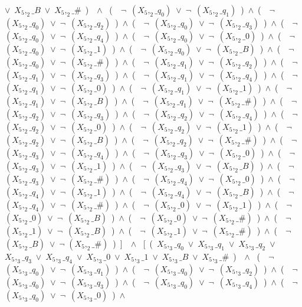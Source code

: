 ﻿\documentclass[a4paper,10pt]{article}
\begin{document}
$\vee$\ $X_5,_2\_B$\ $\vee$\ $X_5,_2\_\#$\ )\ \ $\wedge$ \ (\ \ $\neg$\ $(X_5,_2\_q_0)$\ $\vee$\ $\neg$\ $(X_5,_2\_q_1)$\ )\ $\wedge$\ (\ \ $\neg$\ $(X_5,_2\_q_0)$\ $\vee$\ $\neg$\ $(X_5,_2\_q_2)$\ )\ $\wedge$\ (\ \ $\neg$\ $(X_5,_2\_q_0)$\ $\vee$\ $\neg$\ $(X_5,_2\_q_3)$\ )\ $\wedge$\ (\ \ $\neg$\ $(X_5,_2\_q_0)$\ $\vee$\ $\neg$\ $(X_5,_2\_q_4)$\ )\ $\wedge$\ (\ \ $\neg$\ $(X_5,_2\_q_0)$\ $\vee$\ $\neg$\ $(X_5,_2\_0)$\ )\ $\wedge$\ (\ \ $\neg$\ $(X_5,_2\_q_0)$\ $\vee$\ $\neg$\ $(X_5,_2\_1)$\ )\ $\wedge$\ (\ \ $\neg$\ $(X_5,_2\_q_0)$\ $\vee$\ $\neg$\ $(X_5,_2\_B)$\ )\ $\wedge$\ (\ \ $\neg$\ $(X_5,_2\_q_0)$\ $\vee$\ $\neg$\ $(X_5,_2\_\#)$\ )\ $\wedge$\ (\ \ $\neg$\ $(X_5,_2\_q_1)$\ $\vee$\ $\neg$\ $(X_5,_2\_q_2)$\ )\ $\wedge$\ (\ \ $\neg$\ $(X_5,_2\_q_1)$\ $\vee$\ $\neg$\ $(X_5,_2\_q_3)$\ )\ $\wedge$\ (\ \ $\neg$\ $(X_5,_2\_q_1)$\ $\vee$\ $\neg$\ $(X_5,_2\_q_4)$\ )\ $\wedge$\ (\ \ $\neg$\ $(X_5,_2\_q_1)$\ $\vee$\ $\neg$\ $(X_5,_2\_0)$\ )\ $\wedge$\ (\ \ $\neg$\ $(X_5,_2\_q_1)$\ $\vee$\ $\neg$\ $(X_5,_2\_1)$\ )\ $\wedge$\ (\ \ $\neg$\ $(X_5,_2\_q_1)$\ $\vee$\ $\neg$\ $(X_5,_2\_B)$\ )\ $\wedge$\ (\ \ $\neg$\ $(X_5,_2\_q_1)$\ $\vee$\ $\neg$\ $(X_5,_2\_\#)$\ )\ $\wedge$\ (\ \ $\neg$\ $(X_5,_2\_q_2)$\ $\vee$\ $\neg$\ $(X_5,_2\_q_3)$\ )\ $\wedge$\ (\ \ $\neg$\ $(X_5,_2\_q_2)$\ $\vee$\ $\neg$\ $(X_5,_2\_q_4)$\ )\ $\wedge$\ (\ \ $\neg$\ $(X_5,_2\_q_2)$\ $\vee$\ $\neg$\ $(X_5,_2\_0)$\ )\ $\wedge$\ (\ \ $\neg$\ $(X_5,_2\_q_2)$\ $\vee$\ $\neg$\ $(X_5,_2\_1)$\ )\ $\wedge$\ (\ \ $\neg$\ $(X_5,_2\_q_2)$\ $\vee$\ $\neg$\ $(X_5,_2\_B)$\ )\ $\wedge$\ (\ \ $\neg$\ $(X_5,_2\_q_2)$\ $\vee$\ $\neg$\ $(X_5,_2\_\#)$\ )\ $\wedge$\ (\ \ $\neg$\ $(X_5,_2\_q_3)$\ $\vee$\ $\neg$\ $(X_5,_2\_q_4)$\ )\ $\wedge$\ (\ \ $\neg$\ $(X_5,_2\_q_3)$\ $\vee$\ $\neg$\ $(X_5,_2\_0)$\ )\ $\wedge$\ (\ \ $\neg$\ $(X_5,_2\_q_3)$\ $\vee$\ $\neg$\ $(X_5,_2\_1)$\ )\ $\wedge$\ (\ \ $\neg$\ $(X_5,_2\_q_3)$\ $\vee$\ $\neg$\ $(X_5,_2\_B)$\ )\ $\wedge$\ (\ \ $\neg$\ $(X_5,_2\_q_3)$\ $\vee$\ $\neg$\ $(X_5,_2\_\#)$\ )\ $\wedge$\ (\ \ $\neg$\ $(X_5,_2\_q_4)$\ $\vee$\ $\neg$\ $(X_5,_2\_0)$\ )\ $\wedge$\ (\ \ $\neg$\ $(X_5,_2\_q_4)$\ $\vee$\ $\neg$\ $(X_5,_2\_1)$\ )\ $\wedge$\ (\ \ $\neg$\ $(X_5,_2\_q_4)$\ $\vee$\ $\neg$\ $(X_5,_2\_B)$\ )\ $\wedge$\ (\ \ $\neg$\ $(X_5,_2\_q_4)$\ $\vee$\ $\neg$\ $(X_5,_2\_\#)$\ )\ $\wedge$\ (\ \ $\neg$\ $(X_5,_2\_0)$\ $\vee$\ $\neg$\ $(X_5,_2\_1)$\ )\ $\wedge$\ (\ \ $\neg$\ $(X_5,_2\_0)$\ $\vee$\ $\neg$\ $(X_5,_2\_B)$\ )\ $\wedge$\ (\ \ $\neg$\ $(X_5,_2\_0)$\ $\vee$\ $\neg$\ $(X_5,_2\_\#)$\ )\ $\wedge$\ (\ \ $\neg$\ $(X_5,_2\_1)$\ $\vee$\ $\neg$\ $(X_5,_2\_B)$\ )\ $\wedge$\ (\ \ $\neg$\ $(X_5,_2\_1)$\ $\vee$\ $\neg$\ $(X_5,_2\_\#)$\ )\ $\wedge$\ (\ \ $\neg$ $(X_5,_2\_B)$\ $\vee$\ $\neg$ $(X_5,_2\_\#)$\ )\ ]\ \ $\wedge$ \ [\ (\ $X_5,_3\_q_0$\ $\vee$\ $X_5,_3\_q_1$\ $\vee$\ $X_5,_3\_q_2$\ $\vee$\ $X_5,_3\_q_3$\ $\vee$\ $X_5,_3\_q_4$\ $\vee$\ $X_5,_3\_0$\ $\vee$\ $X_5,_3\_1$\ $\vee$\ $X_5,_3\_B$\ $\vee$\ $X_5,_3\_\#$\ )\ \ $\wedge$ \ (\ \ $\neg$\ $(X_5,_3\_q_0)$\ $\vee$\ $\neg$\ $(X_5,_3\_q_1)$\ )\ $\wedge$\ (\ \ $\neg$\ $(X_5,_3\_q_0)$\ $\vee$\ $\neg$\ $(X_5,_3\_q_2)$\ )\ $\wedge$\ (\ \ $\neg$\ $(X_5,_3\_q_0)$\ $\vee$\ $\neg$\ $(X_5,_3\_q_3)$\ )\ $\wedge$\ (\ \ $\neg$\ $(X_5,_3\_q_0)$\ $\vee$\ $\neg$\ $(X_5,_3\_q_4)$\ )\ $\wedge$\ (\ \ $\neg$\ $(X_5,_3\_q_0)$\ $\vee$\ $\neg$\ $(X_5,_3\_0)$\ )\ $\wedge$\ 
\end{document}
